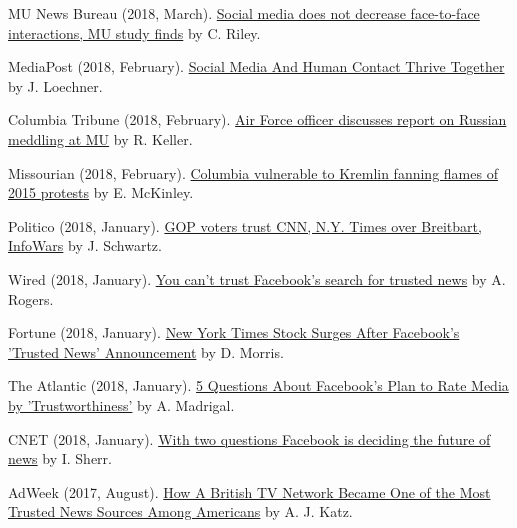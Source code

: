 \begin{bibenum}
    \item[] MU News Bureau (2018, March).
      \href{https://munews.missouri.edu/news-releases/2018/0301-social-media-does-not-decrease-face-to-face-interactions-mu-study-finds/}{Social media does not decrease face-to-face interactions, MU study finds} by C. Riley.
    \item[] MediaPost (2018, February).
      \href{https://mediapost.com/publications/article/315106/social-media-and-human-contact-thrive-together.html}{Social Media And Human Contact Thrive Together} by J. Loechner.
    \item[] Columbia Tribune (2018, February).
      \href{http://www.columbiatribune.com/news/20180217/air-force-officer-discusses-report-on-russian-meddling-at-mu}{Air Force officer discusses report on Russian meddling at MU} by R. Keller.
    \item[] Missourian (2018, February).
      \href{https://www.columbiamissourian.com/news/higher_education/columbia-vulnerable-to-kremlin-fanning-flames-of-protests/article_929cf366-11ad-11e8-9631-63ac0b4a6fd3.html}{Columbia vulnerable to Kremlin fanning flames of 2015 protests} by E. McKinley.
    \item[] Politico (2018, January).
      \href{https://www.politico.com/amp/story/2018/02/06/gop-republican-voters-media-bias-trusted-sites-393650}{ GOP voters trust CNN, N.Y. Times over Breitbart, InfoWars} by J. Schwartz.
    \item[] Wired (2018, January).
      \href{https://www.wired.com/story/you-cant-trust-facebooks-search-for-trusted-news/}{You can't trust Facebook's search for trusted news} by A. Rogers.
    \item[] Fortune (2018, January).
      \href{http://fortune.com/2018/01/21/new-york-times-stock-facebooks-trusted-news/}{New York Times Stock Surges After Facebook's 'Trusted News' Announcement} by D. Morris.
    \item[] The Atlantic (2018, January).
      \href{https://www.theatlantic.com/technology/archive/2018/01/facebook-media-trustworthiness/551045/}{5 Questions About Facebook's Plan to Rate Media by 'Trustworthiness'} by A. Madrigal.
    \item[] CNET (2018, January).
      \href{https://www.cnet.com/news/with-two-questions-facebook-is-deciding-the-future-of-news-zuckerberg-fake-news/}{With two questions Facebook is deciding the future of news} by I. Sherr.
    \item[] AdWeek (2017, August).
      \href{http://www.adweek.com/tvnewser/how-a-british-tv-network-became-one-of-the-most-trusted-news-sources-among-americans/339872}{How A British TV Network Became One of the Most Trusted News Sources Among Americans} by A. J. Katz.

\end{bibenum}
